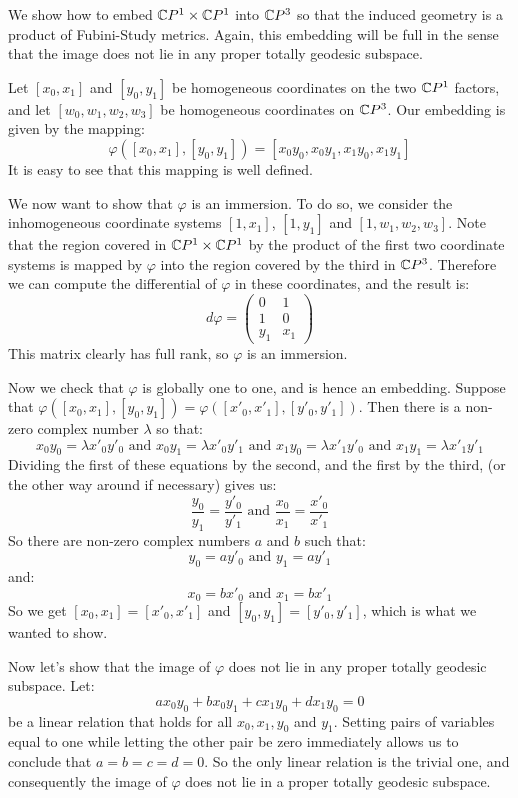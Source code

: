 \begin{example} We show how to embed $\mathbb{C}P^1 \times \mathbb{C}P^1$ into $\mathbb{C}P^3$ so that the induced geometry is a product of Fubini-Study metrics.  Again, this embedding will be full in the sense that the image does not lie in any proper totally geodesic subspace. 

Let $[x_0,x_1]$ and $[y_0, y_1]$ be homogeneous coordinates on the two $\mathbb{C}P^1$ factors, and let $[w_0, w_1, w_2, w_3]$ be homogeneous coordinates on $\mathbb{C}P^3$.  Our embedding is given by the mapping:
%
$$\varphi( [x_0, x_1], [y_0, y_1] ) = [ x_0 y_0, x_0 y_1, x_1 y_0, x_1 y_1 ]$$
%
It is easy to see that this mapping is well defined.

We now want to show that $\varphi$ is an immersion.  To do so, we consider the inhomogeneous coordinate systems $[1,x_1]$, $[1,y_1]$ and $[1,w_1,w_2,w_3]$.  Note that the region covered in $\mathbb{C}P^1 \times \mathbb{C}P^1$ by the product of the first two coordinate systems is mapped by $\varphi$ into the region covered by the third in $\mathbb{C}P^3$.  Therefore we can compute the differential of $\varphi$ in these coordinates, and the result is:
%
$$ d \varphi = \left( \begin{array}{cc} 0 & 1 \\ 1 & 0 \\ y_1 & x_1 \end{array} \right) $$
%
This matrix clearly has full rank, so $\varphi$ is an immersion.

Now we check that $\varphi$ is globally one to one, and is hence an embedding.  Suppose that $\varphi( [x_0, x_1], [y_0, y_1 ] ) = \varphi( [x'_0, x'_1], [y'_0, y'_1 ] )$.  Then there is a non-zero complex number $\lambda$ so that:
%
$$ x_0 y_0 = \lambda x'_0 y'_0 \text{ and } x_0 y_1 = \lambda x'_0 y'_1 \text{ and } x_1 y_0 = \lambda x'_1 y'_0 \text{ and } x_1 y_1 = \lambda x'_1 y'_1 $$
%
Dividing the first of these equations by the second, and the first by the third, (or the other way around if necessary) gives us:
%
$$ \frac{y_0}{y_1} = \frac{y'_0}{y'_1} \text{ and } \frac{x_0}{x_1} = \frac{x'_0}{x'_1} $$
%
So there are non-zero complex numbers $a$ and $b$ such that:
%
$$ y_0 = a y'_0 \text{ and } y_1 = a y'_1 $$
%
and:
%
$$ x_0 = b x'_0 \text{ and } x_1 = b x'_1 $$
%
So we get $[x_0, x_1] = [x'_0, x'_1]$ and $[y_0, y_1] = [y'_0, y'_1]$, which is what we wanted to show.

Now let's show that the image of $\varphi$ does not lie in any proper totally geodesic subspace.  Let:
%
$$ a x_0 y_0 + b x_0 y_1 + c x_1 y_0 + d x_1 y_0 = 0 $$
%
be a linear relation that holds for all $x_0, x_1, y_0$ and $y_1$.  Setting pairs of variables equal to one while letting the other pair be zero immediately allows us to conclude that $a=b=c=d=0$.  So the only linear relation is the trivial one, and consequently the image of $\varphi$ does not lie in a proper totally geodesic subspace.


\end{example}
